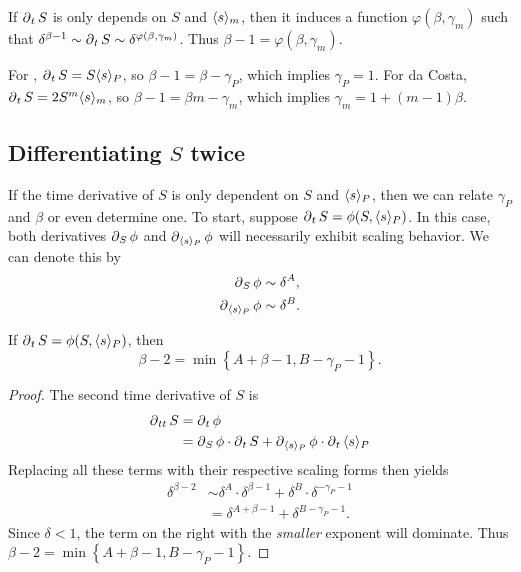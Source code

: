 \documentclass[twoside,10pt]{report}
\begin{document}
If $\operatorname{\partial}_{t}{S} $ is only depends on $S$ and $\langle s \rangle_{m}$, then it induces a function $\varphi(\beta, \gamma_{m})$ such that $\delta^{\beta-1} \sim \operatorname{\partial}_{t}{S} \sim \delta^{\varphi(\beta, \gamma_{m})}$. Thus $\beta-1 = \varphi(\beta, \gamma_{m})$.

\begin{ex}
For \ER, $\operatorname{\partial}_{t}{S} = S \langle s \rangle_{P}$, so $\beta-1 = \beta - \gamma_{P}$, which implies $\gamma_{P}=1$. For da Costa, $\operatorname{\partial}_{t}{S} = 2S^{m} \langle s \rangle_{m}$, so $\beta-1 = \beta m - \gamma_{m}$, which implies $\gamma_{m} = 1 + (m-1)\beta$.
\end{ex}



\subsection{Differentiating \texorpdfstring{$S$}{S} twice}

If the time derivative of $S$ is only dependent on $S$ and $\langle s \rangle_{P}$, then we can relate $\gamma_{P}$ and $\beta$ or even determine one. To start, suppose $\operatorname{\partial}_{t}{S} = \phi(S, \langle s \rangle_{P})$. In this case, both derivatives $\operatorname{\partial}_{S}{\phi} $ and $\operatorname{\partial}_{\langle s \rangle_{P}}{\phi} $ will necessarily exhibit scaling behavior. We can denote this by
\begin{align*}
	\operatorname{\partial}_{S}{\phi} &\sim \delta^{A}, \\
	\operatorname{\partial}_{\langle s \rangle_{P}}{\phi} &\sim \delta^{B}.
\end{align*}

\begin{prop}
	If $\operatorname{\partial}_{t}{S} = \phi(S, \langle s \rangle_{P})$, then
	\[
	\beta-2 = \min\left\{ A+\beta-1, B-\gamma_{P}-1 \right\}.
	\]
\end{prop}
\begin{proof}
	The second time derivative of $S$ is
	\begin{align*}
		\operatorname{\partial}_{tt}{S} &= \operatorname{\partial}_{t}{\phi} \\
			   &= \operatorname{\partial}_{S}{\phi} \cdot \operatorname{\partial}_{t}{S} + \operatorname{\partial}_{\langle s \rangle_{P}}{\phi} \cdot \operatorname{\partial}_{t}{\langle s \rangle_{P}} 
	\end{align*}
	Replacing all these terms with their respective scaling forms then yields
	\begin{align*}
		\delta^{\beta-2} &\sim \delta^{A} \cdot \delta^{\beta-1} + \delta^{B} \cdot \delta^{-\gamma_{P}-1} \\
						 &= \delta^{A + \beta - 1} + \delta^{B - \gamma_{P} - 1}.
	\end{align*}
	Since $\delta < 1$, the term on the right with the \textit{smaller} exponent will dominate. Thus $\beta-2 = \min\left\{ A+\beta-1, B-\gamma_{P}-1 \right\}$.
\end{proof}
\end{document}
